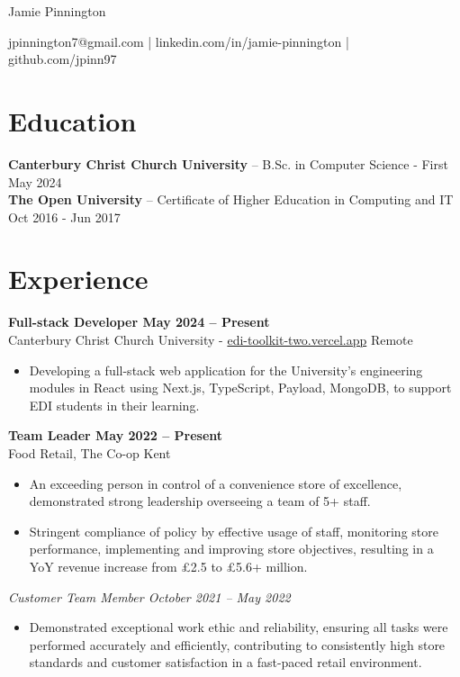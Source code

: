 \documentclass[11pt,letterpaper]{article}
\begin{document}
\centering
\centerline{\Huge Jamie Pinnington}
\vspace{6pt}
\centerline{jpinnington7@gmail.com | linkedin.com/in/jamie-pinnington | github.com/jpinn97}

\section*{Education}
\textbf{Canterbury Christ Church University} -- B.Sc. in Computer Science - First \hfill May 2024 \\
\textbf{The Open University} -- Certificate of Higher Education in Computing and IT \hfill Oct 2016 - Jun 2017

\vspace{-4.5pt}

\section*{Experience}

\textbf{Full-stack Developer \hfill May 2024 -- Present}\\
Canterbury Christ Church University - \href{https://edi-toolkit-two.vercel.app}{edi-toolkit-two.vercel.app} \hfill Remote \\
\vspace{-10pt}
\begin{itemize}
  \item Developing a full-stack web application for the University's engineering modules in React using Next.js, TypeScript, Payload, MongoDB, to support EDI students in their learning.
\end{itemize}

\textbf{Team Leader \hfill May 2022 -- Present}\\
Food Retail, The Co-op \hfill Kent \\
\vspace{-10pt}
\begin{itemize}
  \item An exceeding person in control of a convenience store of excellence, demonstrated strong leadership overseeing a team of 5+ staff.
  \item Stringent compliance of policy by effective usage of staff, monitoring store performance, implementing and improving store objectives, resulting in a YoY revenue increase from £2.5 to £5.6+ million.
\end{itemize}

\textit{Customer Team Member \hfill October 2021 -- May 2022}\\
\vspace{-10pt}
\begin{itemize}
  \item Demonstrated exceptional work ethic and reliability, ensuring all tasks were performed accurately and efficiently, contributing to consistently high store standards and customer satisfaction in a fast-paced retail environment.
\end{itemize}
\end{document}
